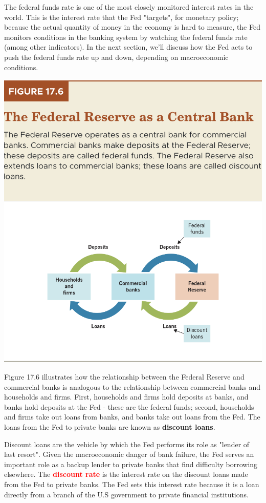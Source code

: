 \documentclass[11pt]{article} %
\begin{document}
The federal funds rate is one of the most closely monitored interest rates in the world. This is the interest rate that the Fed "targets", for monetary policy; because the actual quantity of money in the economy is hard to measure, the Fed monitors conditions in the banking system by watching the federal funds rate (among other indicators). In the next section, we'll discuss how the Fed acts to push the federal funds rate up and down, depending on macroeconomic conditions.
\begin{center}
\includegraphics[scale=0.5]{images/Figure 17.6.png} 
\end{center}

Figure 17.6 illustrates how the relationship between the Federal Reserve and commercial banks is analogous to the relationship between commercial banks and households and firms. First, households and firms hold deposits at banks, and banks hold deposits at the Fed - these are the federal funds; second, households and firms take out loans from banks, and banks take out loans from the Fed. The loans from the Fed to private banks are known as \textbf{discount loans}.

Discount loans are the vehicle by which the Fed performs its role as "lender of last resort". Given the macroeconomic danger of bank failure, the Fed serves an important role as a backup lender to private banks that find difficulty borrowing elsewhere. The \textbf{\textcolor{red}{discount rate}} is the interest rate on the discount loans made from the Fed to private banks. The Fed sets this interest rate because it is a loan directly from a branch of the U.S government to private financial institutions.
\end{document}
